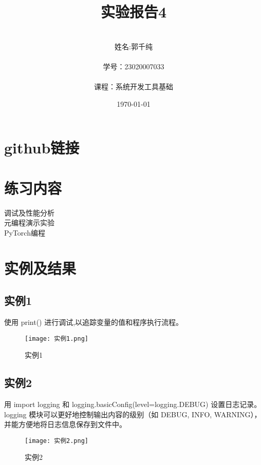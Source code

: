 \documentclass[a4paper, 12pt]{article}
\begin{document}
  \title{实验报告4}
  \author{\\姓名:郭千纯\\
		\\学号：23020007033\\
		\\课程：系统开发工具基础\\}
  \date{\today\\}
  \maketitle
{}
\tableofcontents
\newpage
{}
\section{github链接}


\section{练习内容}
调试及性能分析\\
元编程演示实验\\
PyTorch编程\\

\section{实例及结果}

\subsection{实例1}
使用 print() 进行调试,以追踪变量的值和程序执行流程。

\begin{figure}[h!]
  \centering
  \texttt{[image: 实例1.png]}
  \caption{实例1}
\end{figure}

\subsection{实例2}
用 import logging 和 logging.basicConfig(level=logging.DEBUG) 设置日志记录。logging 模块可以更好地控制输出内容的级别（如 DEBUG, INFO, WARNING），并能方便地将日志信息保存到文件中。

\begin{figure}[h!]
  \centering
  \texttt{[image: 实例2.png]}
  \caption{实例2}
\end{figure}
\end{document}
